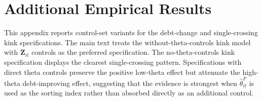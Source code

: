 \clearpage
\setcounter{table}{0}
\renewcommand{\thetable}{B.\arabic{table}}
\setcounter{figure}{0}
\renewcommand{\thefigure}{B.\arabic{figure}}
\setcounter{equation}{0}
\renewcommand{\theequation}{B.\arabic{equation}}

\section{Additional Empirical Results}
\label{appendixB}

This appendix reports control-set variants for the debt-change and single-crossing kink specifications. The main text treats the without-theta-controls kink model with $\mathbf{Z}_{it}$ controls as the preferred specification. The no-theta-controls kink specification displays the clearest single-crossing pattern. Specifications with direct theta controls preserve the positive low-theta effect but attenuate the high-theta debt-improving effect, suggesting that the evidence is strongest when $\widehat\theta^F_{it}$ is used as the sorting index rather than absorbed directly as an additional control.

